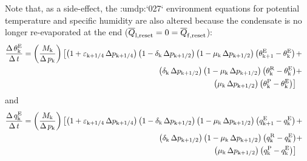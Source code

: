 \documentclass{UMDP_article}
\newcommand{\citeumdp}[1]{:umdp:`#1`}
\newcommand{\lc}{\left[}
\newcommand{\rc}{\right]}
\newcommand{\ov}{\overline}
\newcommand{\lp}{\left(}
\newcommand{\rp}{\right)}
\begin{document}
Note that, as a side-effect, the \citeumdp{027} environment equations for potential
temperature and specific humidity are also altered because the condensate is no
longer re-evaporated at the end (${\ov{Q}}_{\rm{l, reset}} = 0
= {\ov{Q}}_{\rm{f, reset}}$):
%
\begin{eqnarray}
\frac{\Delta \, \theta_{\rm{k}}^{\rm{E}}}{\Delta \, t} = 
\lp \frac{ M_{\rm{k}} }{ \Delta \, p_{\rm{k}} } \rp 
\lc {
\lp { 1 + \varepsilon_{\rm{k} + 1 / 4} \, \Delta p_{\rm{k} + 1 / 4} } \rp
\lp { 1 - \delta_{\rm{k}} \, \Delta p_{\rm{k} + 1 / 2} } \rp
\lp { 1 - \mu_{\rm{k}} \, \Delta p_{\rm{k} + 1 / 2} } \rp 
\lp { \theta_{\rm{k + 1}}^{\rm{E}} - \theta_{\rm{k}}^{\rm{E}} } \rp 
} \right . & + &  \nonumber \\
\lp { \delta_{\rm{k}} \, \Delta p_{\rm{k} + 1 / 2} } \rp
\lp { 1 - \mu_{\rm{k}} \, \Delta p_{\rm{k} + 1 / 2} } \rp 
\lp { \theta_{\rm{k}}^{\rm{R}} - \theta_{\rm{k}}^{\rm{E}} } \rp 
& + &  \nonumber \\
\left . {
\lp { \mu_{\rm{k}} \, \Delta p_{\rm{k} + 1 / 2} } \rp 
\lp { \theta_{\rm{k}}^{\rm{P}} - \theta_{\rm{k}}^{\rm{E}} } \rp 
} \rc & { } &  \label{eq:enviroth}
\end{eqnarray}
%
and 
%
\begin{eqnarray}
\frac{\Delta \, q_{\rm{k}}^{\rm{E}}}{\Delta \, t} = 
\lp \frac{ M_{\rm{k}} }{ \Delta \, p_{\rm{k}} } \rp 
\lc {
\lp { 1 + \varepsilon_{\rm{k} + 1 / 4} \, \Delta p_{\rm{k} + 1 / 4} } \rp
\lp { 1 - \delta_{\rm{k}} \, \Delta p_{\rm{k} + 1 / 2} } \rp
\lp { 1 - \mu_{\rm{k}} \, \Delta p_{\rm{k} + 1 / 2} } \rp 
\lp { q_{\rm{k + 1}}^{\rm{E}} - q_{\rm{k}}^{\rm{E}} } \rp 
} \right . & + &  \nonumber \\
\lp { \delta_{\rm{k}} \, \Delta p_{\rm{k} + 1 / 2} } \rp
\lp { 1 - \mu_{\rm{k}} \, \Delta p_{\rm{k} + 1 / 2} } \rp 
\lp { q_{\rm{k}}^{\rm{R}} - q_{\rm{k}}^{\rm{E}} } \rp 
& + &  \nonumber \\
\left . {
\lp { \mu_{\rm{k}} \, \Delta p_{\rm{k} + 1 / 2} } \rp 
\lp { q_{\rm{k}}^{\rm{P}} - q_{\rm{k}}^{\rm{E}} } \rp 
} \rc & { } &  \label{eq:enviroq}
\end{eqnarray}
\end{document}
